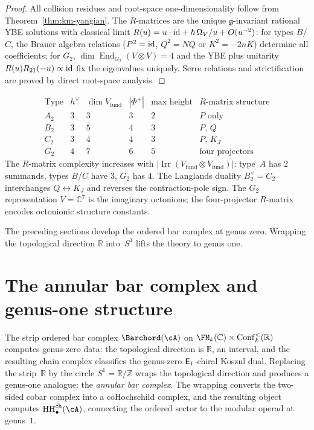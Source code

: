 \begin{proof}
All collision residues and root-space one-dimensionality
follow from Theorem~\ref{thm:km-yangian}. The $R$-matrices
are the unique $\mathfrak{g}$-invariant rational YBE solutions
with classical limit $R(u) = u\cdot\mathrm{id} + \hbar\,\Omega_V/u
+ O(u^{-2})$: for types $B$/$C$, the Brauer algebra relations
($P^2=\mathrm{id}$, $Q^2=NQ$ or $K^2=-2nK$) determine
all coefficients; for $G_2$,
$\dim\operatorname{End}_{G_2}(V\otimes V)=4$ and the YBE
plus unitarity $R(u)R_{21}(-u)\propto\mathrm{id}$ fix the eigenvalues
uniquely. Serre relations and strictification
are proved by direct root-space analysis.
\end{proof}

\begin{remark}
\label{rem:rank-2-comparison}
\label{rem:langlands-ordered-bar}
\label{rem:G2-octonion}
\label{rem:b2-c2-isogeny}
\[
\begin{array}{c|ccccc}
\text{Type} & h^\vee & \dim V_{\mathrm{fund}}
& |\Phi^+| & \text{max height} & R\text{-matrix structure} \\
\hline
A_2 & 3 & 3 & 3 & 2 & P \text{ only} \\
B_2 & 3 & 5 & 4 & 3 & P,\, Q \\
C_2 & 3 & 4 & 4 & 3 & P,\, K_J \\
G_2 & 4 & 7 & 6 & 5 & \text{four projectors}
\end{array}
\]
The $R$-matrix complexity increases with
$|\operatorname{Irr}(V_{\mathrm{fund}} \otimes V_{\mathrm{fund}})|$:
type~$A$ has $2$ summands, types $B$/$C$ have $3$, $G_2$
has $4$.
The Langlands duality $B_2^\vee = C_2$ interchanges
$Q \leftrightarrow K_J$ and reverses the contraction-pole sign.
The $G_2$ representation $V = \mathbb{C}^7$ is the imaginary
octonions; the four-projector $R$-matrix encodes octonionic
structure constants.
\end{remark}
\bigskip
The preceding sections develop the ordered bar complex at genus zero.
Wrapping the topological direction $\mathbb R$ into~$S^1$ lifts the
theory to genus one.

\section{The annular bar complex and genus-one structure}
\label{sec:annular-bar}

The strip ordered bar complex
$\Barchord(\cA)$
on $\FM_k(\mathbb{C})\times\mathrm{Conf}_k^{<}(\mathbb{R})$ computes
genus-zero data: the topological direction is $\mathbb{R}$, an interval,
and the resulting chain complex classifies the genus-zero
$\mathsf{E}_1$-chiral Koszul dual.
Replacing the strip~$\mathbb{R}$ by the circle
$S^1=\mathbb{R}/\mathbb{Z}$ wraps the topological direction
and produces a genus-one analogue: the \emph{annular bar complex}.
The wrapping converts the two-sided cobar complex into a
coHochschild complex, and the resulting object computes
$\HH^{\mathrm{ch}}_\bullet(\cA)$, connecting the ordered sector to the
modular operad at genus~$1$.

